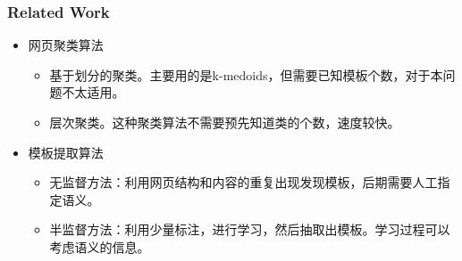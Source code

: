 \documentclass[11pt,presentation]{beamer}
\begin{document}
\begin{frame}
\frametitle{Related Work}
\label{sec-1-4}
\begin{itemize}

\item 网页聚类算法
\label{sec-1-4-1}%
\begin{itemize}
\item 基于划分的聚类。主要用的是k-medoids，但需要已知模板个数，对于本问题不太适用。
\item 层次聚类。这种聚类算法不需要预先知道类的个数，速度较快。
\end{itemize}


\item 模板提取算法
\label{sec-1-4-2}%
\begin{itemize}
\item 无监督方法：利用网页结构和内容的重复出现发现模板，后期需要人工指定语义\cite{2}。
\item 半监督方法：利用少量标注，进行学习，然后抽取出模板。学习过程可以考虑语义的信息\cite{3}。
\end{itemize}

\end{itemize} %
\end{frame}
\end{document}
